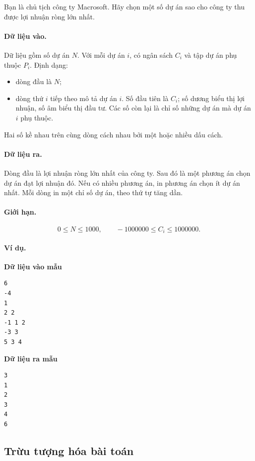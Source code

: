 \documentclass[11pt]{article}
\begin{document}
Bạn là chủ tịch công ty Macrosoft. Hãy chọn một số dự án sao cho công ty thu
được lợi nhuận ròng lớn nhất.

\paragraph{Dữ liệu vào.}
Dữ liệu gồm số dự án \(N\). Với mỗi dự án \(i\), có ngân sách \(C_i\) và tập
dự án phụ thuộc \(P_i\). Định dạng:
\begin{itemize}
  \item dòng đầu là \(N\);
  \item dòng thứ \(i\) tiếp theo mô tả dự án \(i\). Số đầu tiên là \(C_i\);
  số dương biểu thị lợi nhuận, số âm biểu thị đầu tư. Các số còn lại là chỉ
  số những dự án mà dự án \(i\) phụ thuộc.
\end{itemize}
Hai số kề nhau trên cùng dòng cách nhau bởi một hoặc nhiều dấu cách.

\paragraph{Dữ liệu ra.}
Dòng đầu là lợi nhuận ròng lớn nhất của công ty. Sau đó là một phương án chọn
dự án đạt lợi nhuận đó. Nếu có nhiều phương án, in phương án chọn ít dự án
nhất. Mỗi dòng in một chỉ số dự án, theo thứ tự tăng dần.

\paragraph{Giới hạn.}
\[
  0\le N\le 1000,\qquad -1000000\le C_i\le 1000000.
\]

\paragraph{Ví dụ.}
\noindent\begin{minipage}[t]{0.45\linewidth}
\textbf{Dữ liệu vào mẫu}
\begin{verbatim}
6
-4
1
2 2
-1 1 2
-3 3
5 3 4
\end{verbatim}
\end{minipage}\hfill
\begin{minipage}[t]{0.45\linewidth}
\textbf{Dữ liệu ra mẫu}
\begin{verbatim}
3
1
2
3
4
6
\end{verbatim}
\end{minipage}

\subsection{Trừu tượng hóa bài toán}
\end{document}
